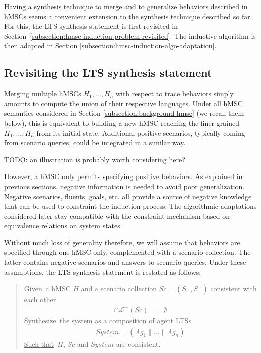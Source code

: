 Having a synthesis technique to merge and to generalize behaviors described in hMSCs seems a convenient extension to the synthesis technique described so far. For this, the LTS synthesis statement is first revisited in Section~\ref{subsection:hmsc-induction-problem-revisited}. The inductive algorithm is then adapted in Section \ref{subsection:hmsc-induction-algo-adaptation}.

\subsection{Revisiting the LTS synthesis statement\label{subsection:hmsc-induction-problem-revisited}}

Merging multiple hMSCs $H_1,\ldots,H_n$ with respect to trace behaviors simply amounts to compute the union of their respective languages. Under all hMSC semantics considered in Section \ref{subsection:background-hmsc} (we recall them below), this is equivalent to building a new hMSC reaching the finer-grained $H_1,\ldots,H_n$ from its initial state. Additional positive scenarios, typically coming from scenario queries, could be integrated in a similar way.

TODO: an illustration is probably worth considering here?

However, a hMSC only permits specifying positive behaviors. As explained in previous sections, negative information is needed to avoid poor generalization. Negative scenarios, fluents, goals, etc. all provide a source of negative knowledge that can be used to constraint the induction process. The algorithmic adaptations considered later stay compatible with the constraint mechanism based on equivalence relations on system states.

Without much loss of generality therefore, we will assume that behaviors are specified through one hMSC only, complemented with a scenario collection. The latter contains negative scenarios and answers to scenario queries. Under these assumptions, the LTS synthesis statement is restated as follows: 

\begin{quote}
\underline{Given}~a hMSC $H$ and a scenario collection $Sc = (S^+,S^-)$ consistent with each other
\begin{align*}
[\mathcal{L}^+(Sc) \cup \mathcal{L}(H)] \cap \mathcal{L}^-(Sc) &= \emptyset
\end{align*}
\underline{Synthesize}~the system as a composition of agent LTSs
\begin{align*}
System = (Ag_1 \parallel \ldots \parallel Ag_n)
\end{align*}
\underline{Such that}~$H$, $Sc$ and $System$ are consistent.
\end{quote}

